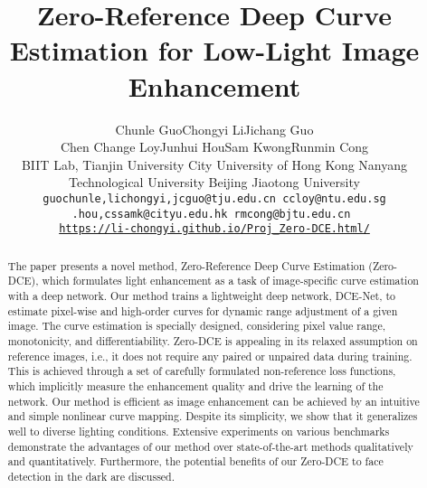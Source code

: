 \documentclass[10pt,twocolumn,letterpaper]{article}
\begin{document}
\title{Zero-Reference Deep Curve Estimation for Low-Light Image Enhancement}


\author{Chunle Guo\footnotemark[1]\quad  Chongyi Li\footnotemark[1]\quad  Jichang Guo\footnotemark[2]\quad  \\
	\quad Chen Change Loy\quad  Junhui Hou\quad Sam Kwong\quad Runmin Cong\\
	\small{} \small BIIT Lab, Tianjin University \quad
	\small{} \small City University of Hong Kong \quad
	\small{} \small Nanyang Technological University\quad
	\small{} \small Beijing Jiaotong University \quad\\
	{\tt\small guochunle,lichongyi,jcguo@tju.edu.cn  \quad ccloy@ntu.edu.sg}\\
		{\tt\smalljh.hou,cssamk@cityu.edu.hk \quad rmcong@bjtu.edu.cn }\\
	{\tt\small \url{https://li-chongyi.github.io/Proj_Zero-DCE.html/}}
}






\maketitle
\thispagestyle{empty}
\renewcommand{\thefootnote}{\fnsymbol{footnote}}
\vspace{-8pt}
\begin{abstract}
The paper presents a novel method, Zero-Reference Deep Curve Estimation (Zero-DCE), which formulates light enhancement as a task of image-specific curve estimation with a deep network.  Our method trains a lightweight deep network, DCE-Net, to estimate pixel-wise and high-order curves for dynamic range adjustment of a given image. The curve estimation is specially designed, considering pixel value range, monotonicity, and differentiability. Zero-DCE is appealing in its relaxed assumption on reference images, i.e., it does not require any paired or unpaired data during training. This is achieved through a set of carefully formulated non-reference loss functions, which implicitly measure the enhancement quality and drive the learning of the network. Our method is efficient as image enhancement can be achieved by an intuitive and simple nonlinear curve mapping. Despite its simplicity, we show that it generalizes well to diverse lighting conditions. Extensive experiments on various benchmarks demonstrate the advantages of our method over state-of-the-art methods qualitatively and quantitatively. Furthermore, the potential benefits of our Zero-DCE to face detection in the dark are discussed.
\end{abstract}
\end{document}

